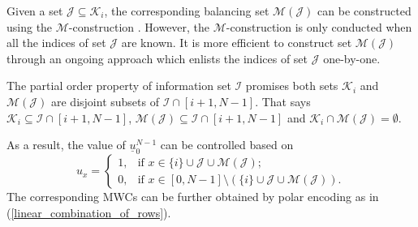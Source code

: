 \documentclass[12pt, draftclsnofoot, peerreview, onecolumn]{IEEEtran}
\theoremstyle{noparent}
\begin{document}
Given a set $\mathcal{J}\subseteq\mathcal{K}_i$, 
the corresponding balancing set $\mathcal{M}(\mathcal{J})$ can be constructed using the
$\mathcal{M}$-construction \cite{Rowshan2023FormationMinweight}. 
However, the $\mathcal{M}$-construction is only conducted when all
the indices of set $\mathcal{J}$ are known.
It is more efficient to construct set $\mathcal{M}(\mathcal{J})$ through an 
ongoing approach \cite{Rowshan2022FastEnumerationMinimum} 
which enlists the indices of set $\mathcal{J}$ one-by-one.




















































The partial order property of 
information set $\mathcal{I}$ promises both 
sets $\mathcal{K}_i$ and $\mathcal{M}(\mathcal{J})$ are 
disjoint subsets of $\mathcal{I}\cap[i+1,N-1]$.
That says $\mathcal{K}_i\subseteq \mathcal{I}\cap[i+1,N-1]$,
$\mathcal{M}(\mathcal{J})\subseteq\mathcal{I}\cap[i+1,N-1]$
and $\mathcal{K}_i\cap\mathcal{M}(\mathcal{J})=\emptyset$.

As a result, the value of $\underline{u}_0^{N-1}$ can be controlled based on 
\begin{equation}
    \label{polar_u_setting}
    u_{x}=
    \begin{cases}
    1, & \text {if } x\in \{i\}\cup\mathcal{J}\cup\mathcal{M}(\mathcal{J});\\
    0, & \text {if } x\in [0,N-1]\setminus(\{i\}\cup\mathcal{J}\cup\mathcal{M}(\mathcal{J})).
    \end{cases}
\end{equation}
The corresponding MWCs can be further obtained by polar encoding as in (\ref{linear_combination_of_rows}).
\end{document}
